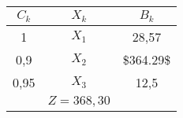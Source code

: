    \begin{tabular}{ccc}
    \hline
    \hline
    $C_k$   & $X_k$   & $B_k$ \bigstrut\\
    \hline
    1       & $X_1$   & 28,57 \bigstrut[t]\\
    0,9     & $X_2$   & \$364.29\$ \\
    0,95    & $X_3$   & 12,5 \bigstrut[b]\\
    \hline
            & $Z=368,30$ &  \bigstrut\\
    \hline
    \hline
    \end{tabular}%
